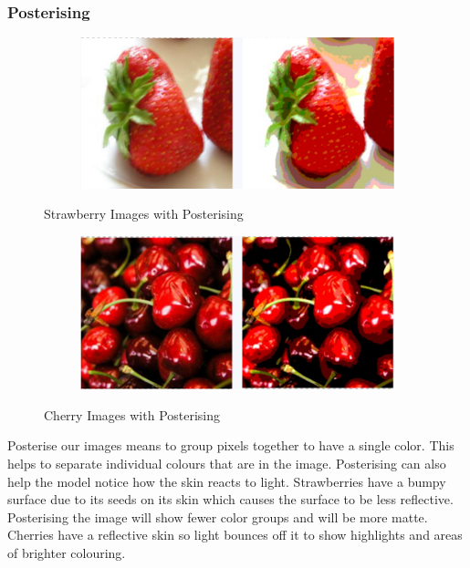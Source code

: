 \documentclass[../main.tex]{subfiles}
\begin{document}
\subsubsection{Posterising}

\begin{figure}[h!]
  \centering
  \begin{subfigure}[b]{0.5\linewidth}
    \includegraphics[width=\linewidth]{strawberry.png}
  \end{subfigure}
  \caption{Strawberry Images with Posterising}
  \label{fig:strawberry-postering-edit}
\end{figure}

\begin{figure}[h!]
  \centering
  \begin{subfigure}[b]{0.5\linewidth}
    \includegraphics[width=\linewidth]{cherry.png}
  \end{subfigure}
  \caption{Cherry Images with Posterising}
  \label{fig:cherry-postering-edit}
\end{figure}

Posterise our images means to group pixels together to have a single color. This helps to separate individual colours that are in the image. Posterising can also help the model notice how the skin reacts to light. 
Strawberries have a bumpy surface due to its seeds on its skin which causes the surface to be less reflective. Posterising the image will show fewer color groups and will be more matte. 
Cherries have a reflective skin so light bounces off it to show highlights and areas of brighter colouring. 
\end{document}
